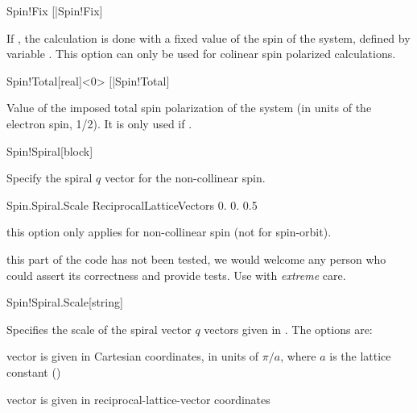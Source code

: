   \begin{fdflogicalF}{Spin!Fix}
    [|Spin!Fix]%
  
    If \fdftrue, the calculation is done with a fixed value of the spin
    of the system, defined by variable . This option can
    only be used for colinear spin polarized calculations.
  
  \end{fdflogicalF}
  
  \begin{fdfentry}{Spin!Total}[real]<$0$>
    [|Spin!Total]
  
    Value of the imposed total spin polarization of the system (in units
    of the electron spin, 1/2). It is only used if  \fdftrue.
  
  \end{fdfentry}
  
  \begin{fdfentry}{Spin!Spiral}[block]
  
    Specify the spiral $q$ vector for the non-collinear spin.
  
    \begin{fdfexample}
      Spin.Spiral.Scale ReciprocalLatticeVectors
        0. 0. 0.5
    \end{fdfexample}
  
    \note this option only applies for non-collinear spin (not for
    spin-orbit).
  
    \note this part of the code has not been tested, we would welcome
    any person who could assert its correctness and provide tests. Use
    with \emph{extreme} care.
  
  \end{fdfentry}
  
  \begin{fdfentry}{Spin!Spiral.Scale}[string]
  
    Specifies the scale of the spiral vector $q$ vectors given in .
    The options are:
    \begin{fdfoptions}
      \option[pi/a]%
      vector is given in Cartesian coordinates, in units
      of $\pi/a$, where $a$ is the lattice constant ()
  
      \option[ReciprocalLatticeVectors]%
      vector is given in reciprocal-lattice-vector coordinates
  
    \end{fdfoptions}
  
  \end{fdfentry}
  
